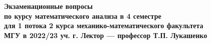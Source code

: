 \documentclass{article}
\begin{document}
\sectionfont{\bfseries} %

\begin{center}
{\fontsize{16}{24}\selectfont \textbf{Экзаменационные вопросы}}\\[2pt]
{\fontsize{11}{12}\selectfont \textbf{по курсу математического анализа в 4 семестре}}\\[2pt]
{\fontsize{11}{12}\selectfont \textbf{для 1 потока 2 курса механико-математического факультета}}\\[2pt]
{\fontsize{11}{12}\selectfont \textbf{МГУ в 2022/23 уч. г. Лектор --- профессор Т.П. Лукашенко}}
\end{center}
\end{document}

